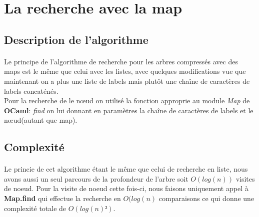 \section{La recherche avec la map}
\subsection{Description de l'algorithme}
\paragraph{}
Le principe de l'algorithme de recherche pour les arbres compressés avec des maps est le même que celui avec les listes, avec quelques modifications vue que maintenant on a plus une liste de labels mais plutôt une chaîne de caractères de labels concaténés.\\
Pour la recherche de le nœud on utilisé la fonction approprie au module \textit{Map} de \textbf{OCaml}: \textit{find} on lui donnant en paramètres la chaîne de caractères de labels et le nœud(autant que map).


\subsection{Complexité}
\paragraph{}
Le princie de cet algorithme étant le même que celui de recherche en liste, nous avons aussi un seul parcours de la profondeur de l'arbre soit $O(log(n))$ visites de noeud. Pour la visite de noeud cette fois-ci, nous faisons uniquement appel à \textbf{Map.find} qui effectue la recherche en $O(log(n)$ comparaisons \cite{refMap} ce qui donne une complexité totale de $O(log(n)²)$.